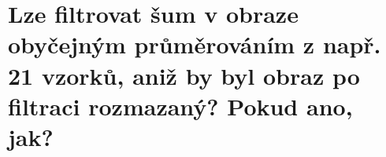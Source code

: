 \section{Lze filtrovat šum v obraze obyčejným průměrováním z např. 21 vzorků, aniž by byl obraz po filtraci rozmazaný? 
Pokud ano, jak?}